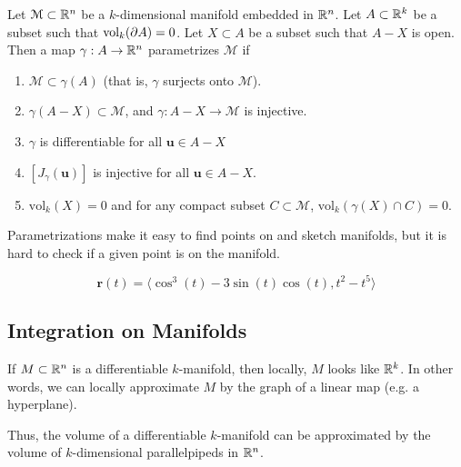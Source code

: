 \begin{definition}[Parametrization]
    Let $\mathcal{M} \subset \mathbb{R}^n$ be a $k$-dimensional manifold embedded in $\mathbb{R}^n$.  Let $A \subset \mathbb{R}^k$ be a subset such that $\textnormal{vol}_k(\partial A) = 0$.  Let $X \subset A$ be a subset such that $A - X$ is open.  Then a map $\gamma : A \to \mathbb{R}^n$ parametrizes $\mathcal{M}$ if 
    
    \begin{enumerate}
        \item $\mathcal{M} \subset \gamma(A)$ (that is, $\gamma$ surjects onto $\mathcal{M}$).
        \item $\gamma(A - X) \subset \mathcal{M}$, and $\gamma : A - X \to \mathcal{M}$ is injective. 

        \item $\gamma$ is differentiable for all $\bm{u} \in A-X$   
        \item $[J_\gamma(\bm{u})]$ is injective for all $\bm{u} \in A - X$. 
        
        \item $\text{vol}_k(X) = 0$ and for any compact subset $C \subset \mathcal{M}$, $\text{vol}_k(\gamma(X) \cap C) = 0$.
    \end{enumerate}
    \end{definition}

\begin{remark}
    Parametrizations make it easy to find points on and sketch manifolds, but it is hard to check if a given point is on the manifold.
    
    $$\bm{r}(t) =  \langle \cos^3(t) - 3\sin(t)\cos(t), t^2-t^5 \rangle$$
    \end{remark}




\subsection{Integration on Manifolds}

\begin{remark}
    If $M \subset \mathbb{R}^n$ is a differentiable $k$-manifold, then locally, $M$ looks like $\mathbb{R}^k$.  In other words, we can locally approximate $M$ by the graph of a linear map (e.g. a hyperplane).  
    \end{remark}
    
    
    
    
    \begin{remark}
    Thus, the volume of a differentiable $k$-manifold can be approximated by the volume of $k$-dimensional parallelpipeds in $\mathbb{R}^n$.
    \end{remark}

